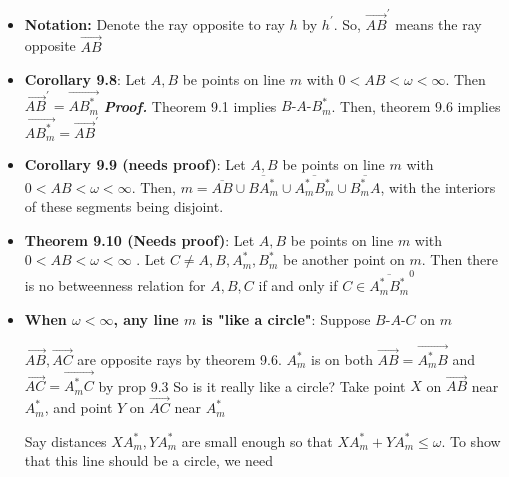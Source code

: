 \documentclass{report}
\begin{document}
\begin{itemize}
        \item \textbf{Notation:} Denote the ray opposite to ray $h$ by $h^{\prime}$. So, $\overrightarrow{AB}^{\prime}$ means the ray opposite $\overrightarrow{AB} $
        \item \textbf{Corollary 9.8}: Let $A,B$ be points on line $m$ with $0 <AB<\omega <\infty$. Then $\overrightarrow{AB}^{\prime} = \overrightarrow{AB_{m}^{*}} $
            \bigbreak \noindent 
            \textbf{\textit{Proof.}} Theorem 9.1 implies $ B\text{-}A\text{-}B_{m}^{*}$. Then, theorem 9.6 implies $\overrightarrow{AB_{m}^{*}}  = \overrightarrow{AB}^{\prime}$
        \item \textbf{Corollary 9.9 (needs proof)}: Let $A,B$ be points on line $m$ with $ 0 < AB < \omega < \infty$. Then, $ m = \overline{AB} \cup \overline{BA_{m}^{*}} \cup \overline{A_{m}^{*}B_{m}^{*}} \cup \overline{B_{m}^{*}A}$, with the interiors of these segments being disjoint.
        \item \textbf{Theorem 9.10 (Needs proof)}: Let $A,B$ be points on line $m$ with $0 < AB < \omega < \infty$ . Let $C \ne A,B,A_{m}^{*}, B_{m}^{*} $ be another point on $m$. Then there is no betweenness relation for $A,B,C$ if and only if $C \in \overline{A_{m}^{*}B_{m}^{*}}^{0}$
        \item \textbf{When $\omega < \infty$, any line $m$ is "like a circle"}: Suppose $ B\text{-}A\text{-}C$ on $m$
            \bigbreak \noindent 
            \begin{figure}[ht]
                \centering
                \label{fig:lineah}
            \end{figure}
            \bigbreak \noindent 
            $\overrightarrow{AB}, \overrightarrow{AC}$ are opposite rays by theorem 9.6. $A_{m}^{*}$ is on both $ \overrightarrow{AB} = \overrightarrow{A_{m}^{*}B}$ and $\overrightarrow{AC} = \overrightarrow{A_{m}^{*}C} $ by prop 9.3
            \bigbreak \noindent 
            So is it really like a circle? Take point $X$ on $\overrightarrow{AB}$ near $A_{m}^{*}$, and point $Y$ on $\overrightarrow{AC}$ near $A_{m}^{*} $
            \bigbreak \noindent 
            \begin{figure}[ht]
                \centering
                \label{fig:lineah2}
            \end{figure}
            \bigbreak \noindent 
            Say distances $XA_{m}^{*}, YA_{m}^{*}$ are small enough so that $XA_{m}^{*} + YA_{m}^{*} \leq \omega$. To show that this line should be a circle, we need 

\end{itemize}
\end{document}
